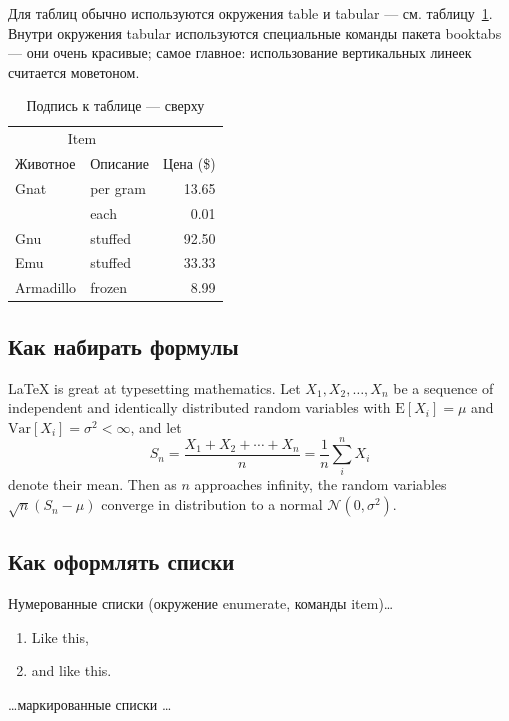 Для таблиц обычно используются окружения table и tabular --- см. таблицу~\ref{tab:widgets}. Внутри окружения tabular используются специальные команды пакета booktabs — они очень красивые; самое главное: использование вертикальных линеек считается моветоном.

\begin{table}
\centering
\caption{\label{tab:widgets}Подпись к таблице --- сверху}
\begin{tabular}{llr}
\toprule
\multicolumn{2}{c}{Item} \\
\cmidrule(r){1-2}
Животное  & Описание    & Цена (\$) \\
\midrule
Gnat      & per gram    & 13.65      \\
          & each        & 0.01       \\
Gnu       & stuffed     & 92.50      \\
Emu       & stuffed     & 33.33      \\
Armadillo & frozen      & 8.99       \\
\bottomrule
\end{tabular}
\end{table}

\subsection{Как набирать формулы}

\LaTeX{} is great at typesetting mathematics. Let $X_1, X_2, \ldots, X_n$ be a sequence of independent and identically distributed random variables with $\text{E}[X_i] = \mu$ and $\text{Var}[X_i] = \sigma^2 < \infty$, and let
$$S_n = \frac{X_1 + X_2 + \cdots + X_n}{n}
      = \frac{1}{n}\sum_{i}^{n} X_i$$
denote their mean. Then as $n$ approaches infinity, the random variables $\sqrt{n}(S_n - \mu)$ converge in distribution to a normal $\mathcal{N}(0, \sigma^2)$.

\subsection{Как оформлять списки}

Нумерованные списки (окружение enumerate, команды item)…

\begin{enumerate}
  \item Like this,
  \item and like this.
\end{enumerate}

\dots маркированные списки \dots

